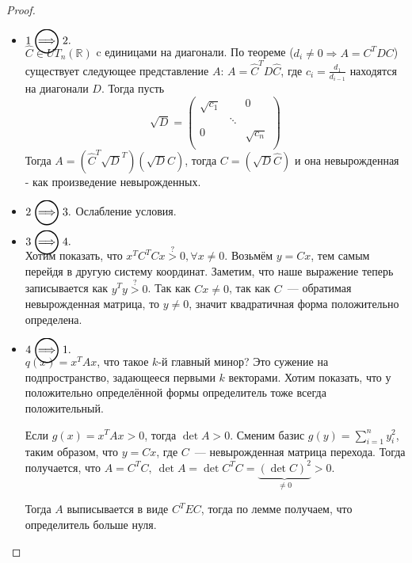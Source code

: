 \begin{proof}\leavevmode
    \begin{itemize}
        \item $1 \ora 2.$\\
            $\hat{C}\in UT_n(\mathbb{R})$ c единицами на диагонали.
            По теореме ($d_i \ne 0 \Rightarrow A = C^TDC$) %
            существует следующее представление $A$:
            $A = \hat{C}^T D \hat{C}$, где $c_i = \frac{d_1}{d_{i - 1}}$ находятся на диагонали $D$.
            Тогда пусть
            \[
                \sqrt{D} = 
                \begin{pmatrix}
                    \sqrt{c_1} & & 0 \\
                    & \ddots &\\
                    0 & & \sqrt{c_n}\\
                \end{pmatrix}
            \]
			Тогда $A = \left(\hat{C}^T\sqrt{D}^T\right)\left(\sqrt{D}\hat{C}\right)$, тогда $C=\left(\sqrt{D}\hat{C}\right)$ и она невырожденная - как произведение 
            невырожденных.
        \item
            $2 \ora 3.$ Ослабление условия.
        \item
            $3 \ora 4.$\\
            Хотим показать, что $x^TC^T Cx \stackrel{?}{>} 0, \forall x\not=0$. Возьмём  $y  = Cx$, тем самым перейдя в другую систему 
            координат. Заметим, что наше выражение теперь записывается как  $y^Ty \stackrel{?}{>} 0$. Так как $Cx \not =0$, так как
            $C$~--- обратимая невырожденная матрица, то $y \not= 0$, значит квадратичная форма положительно определена.
        \item
            $4 \ora 1.$\\
            $q(x) = x^T A x$, что такое $k$-й главный минор? Это сужение на подпространство, задающееся первыми 
            $k$ векторами.
            Хотим показать, что у положительно определённой формы определитель тоже всегда положительный.
            \begin{lemma}
                Если $g(x)  = x^T A x > 0$, тогда  $\det A > 0$.
                Сменим базис $g(y) = \sum\limits_{i = 1}^{n}{y_i^2}$, таким образом, что $y = Cx$, где $C$~--- невырожденная матрица
                перехода. Тогда получается, что $A = C^TC, \ \det A = \det C^T C = \underbrace{(\det C)^2}_{\not= 0} > 0$.
            \end{lemma}
            Тогда  $A$ выписывается в виде $C^TEC$, тогда по лемме получаем, что определитель больше нуля.
    \end{itemize}
\end{proof}
